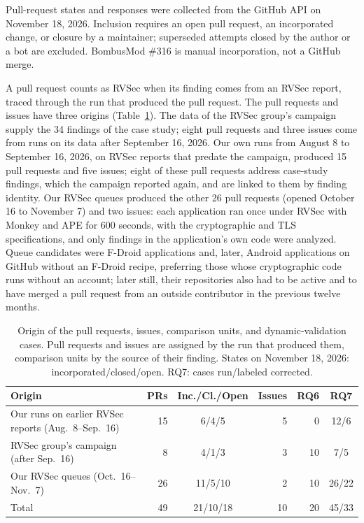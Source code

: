 \documentclass[conference]{IEEEtran}
\begin{document}
Pull-request states and responses were collected from the GitHub API on
November 18, 2026. Inclusion requires an open pull request, an incorporated change, or closure
by a maintainer; superseded attempts closed by the author or a bot are
excluded. BombusMod \#316 is manual incorporation, not a GitHub merge.

A pull request counts as RVSec when its finding comes from an RVSec report,
traced through the run that produced the pull request. The pull requests and
issues have three origins (Table~\ref{tab:origin}). The data of the RVSec group's
campaign~\cite{costa2026effectiveness} supply the 34 findings of the case
study; eight pull requests and three issues come from runs on its data after
September 16, 2026. Our own runs from August 8 to September 16, 2026, on RVSec
reports that predate the campaign, produced 15 pull requests and five issues;
eight of these pull requests address case-study findings, which the campaign
reported again, and are linked to them by finding identity. Our RVSec queues
produced the other 26 pull requests (opened October 16 to November 7) and two
issues: each application ran once under RVSec with Monkey and APE for 600
seconds, with the cryptographic and TLS specifications, and only findings in
the application's own code were analyzed. Queue candidates were F-Droid
applications and, later, Android applications on GitHub without an F-Droid
recipe, preferring those whose cryptographic code runs without an account;
later still, their repositories also had to be active and to have merged a
pull request from an outside contributor in the previous twelve months.

\begin{table}[H]
\centering
\caption{Origin of the pull requests, issues, comparison units, and
dynamic-validation cases. Pull requests and issues are assigned by the run
that produced them, comparison units by the source of their finding. States
on November 18, 2026: incorporated/closed/open. RQ7: cases run/labeled
corrected.}
\label{tab:origin}
\footnotesize
\setlength{\tabcolsep}{3pt}
\begin{tabular}{p{3.0cm}rcrrc}
\toprule
Origin & PRs & Inc./Cl./Open & Issues & RQ6 & RQ7 \\
\midrule
Our runs on earlier RVSec reports (Aug.~8--Sep.~16) & 15 & 6/4/5 & 5 & 0 & 12/6 \\
RVSec group's campaign (after Sep.~16) & 8 & 4/1/3 & 3 & 10 & 7/5 \\
Our RVSec queues (Oct.~16--Nov.~7) & 26 & 11/5/10 & 2 & 10 & 26/22 \\
\midrule
Total & 49 & 21/10/18 & 10 & 20 & 45/33 \\
\bottomrule
\end{tabular}
\end{table}
\end{document}
